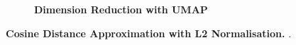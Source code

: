 \begin{figure}
\begin{adjustbox}{minipage=\dimexpr{}\fboxrule,fbox}
\begin{subfigure}[b]{0.475\textwidth}
            \caption[Dimension Reduction with UMAP]{\textbf{Dimension Reduction with UMAP}}
            \label{fig:2.4.2b}
        \end{subfigure}
    \end{adjustbox}
    \caption[Cosine Distance Approximation with L2 Normalisation]{\textbf{Cosine Distance Approximation with L2 Normalisation.} .}
    \label{fig:2.4.2}
\end{figure}